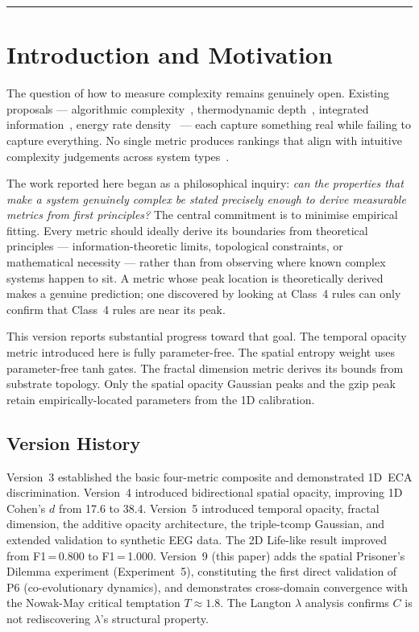 \documentclass[12pt,a4paper]{article}
\begin{document}
\rule{\linewidth}{0.4pt}

\section{Introduction and Motivation}

The question of how to measure complexity remains genuinely open.
Existing proposals --- algorithmic complexity~\cite{kolmogorov1965},
thermodynamic depth~\cite{lloyd1988}, integrated
information~\cite{tononi2004}, energy rate density~\cite{chaisson2001}
--- each capture something real while failing to capture everything.
No single metric produces rankings that align with intuitive complexity
judgements across system types~\cite{gell-mann1996,ladyman2013}.

The work reported here began as a philosophical inquiry: \emph{can
the properties that make a system genuinely complex be stated precisely
enough to derive measurable metrics from first principles?}
The central commitment is to minimise empirical fitting.
Every metric should ideally derive its boundaries from theoretical
principles --- information-theoretic limits, topological constraints,
or mathematical necessity --- rather than from observing where known
complex systems happen to sit.
A metric whose peak location is theoretically derived makes a genuine
prediction; one discovered by looking at Class~4 rules can only confirm
that Class~4 rules are near its peak.

This version reports substantial progress toward that goal.
The temporal opacity metric introduced here is fully parameter-free.
The spatial entropy weight uses parameter-free tanh gates.
The fractal dimension metric derives its bounds from substrate topology.
Only the spatial opacity Gaussian peaks and the gzip peak retain
empirically-located parameters from the 1D calibration.

\subsection*{Version History}

Version~3 established the basic four-metric composite and demonstrated
1D~ECA discrimination.
Version~4 introduced bidirectional spatial opacity, improving 1D
Cohen's $d$ from 17.6 to 38.4.
Version~5 introduced temporal opacity, fractal dimension,
the additive opacity architecture, the triple-tcomp Gaussian, and
extended validation to synthetic EEG data.
The 2D Life-like result improved from F1\,=\,0.800 to F1\,=\,1.000.
Version~9 (this paper) adds the spatial Prisoner's Dilemma experiment
(Experiment~5), constituting the first direct validation of P6
(co-evolutionary dynamics), and demonstrates cross-domain convergence
with the Nowak-May critical temptation $T\!\approx\!1.8$.
The Langton $\lambda$ analysis confirms $C$ is not rediscovering
$\lambda$'s structural property.
\end{document}
